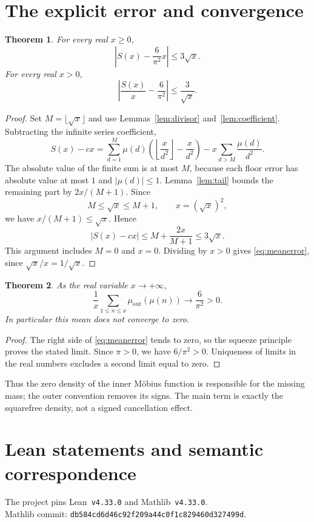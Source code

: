 \documentclass[11pt]{article}
\newtheorem{theorem}{Theorem}
\newcommand{\sfcount}{S}
\begin{document}
\section{The explicit error and convergence}
\begin{theorem}\label{thm:error}
For every real $x\geq0$,
\begin{equation}\label{eq:error}
\left|\sfcount(x)-\frac6{\pi^2}x\right|\leq3\sqrt{x}.
\end{equation}
For every real $x>0$,
\begin{equation}\label{eq:meanerror}
\left|\frac{\sfcount(x)}x-\frac6{\pi^2}\right|
\leq\frac3{\sqrt{x}}.
\end{equation}
\end{theorem}
\begin{proof}
Set $M=\lfloor\sqrt{x}\rfloor$ and use Lemmas~\ref{lem:divisor}
and~\ref{lem:coefficient}. Subtracting the infinite series coefficient,
\[
\sfcount(x)-cx
=\sum_{d=1}^{M}\mu(d)
  \left(\left\lfloor\frac{x}{d^2}\right\rfloor-\frac{x}{d^2}\right)
 -x\sum_{d>M}\frac{\mu(d)}{d^2}.
\]
The absolute value of the finite sum is at most $M$, because each
floor error has absolute value at most $1$ and $|\mu(d)|\leq1$.
Lemma~\ref{lem:tail} bounds the remaining part by $2x/(M+1)$.
Since
\[
M\leq\sqrt{x}\leq M+1,\qquad x=(\sqrt{x})^2,
\]
we have $x/(M+1)\leq\sqrt{x}$. Hence
\[
|\sfcount(x)-cx|\leq M+\frac{2x}{M+1}\leq3\sqrt{x}.
\]
This argument includes $M=0$ and $x=0$. Dividing by $x>0$ gives
\eqref{eq:meanerror}, since $\sqrt{x}/x=1/\sqrt{x}$.
\end{proof}

\begin{theorem}\label{thm:limit}
As the real variable $x\to+\infty$,
\[
\frac1x\sum_{1\leq n\leq x}\mu_{\mathrm{out}}(\mu(n))
\longrightarrow\frac6{\pi^2}>0.
\]
In particular this mean does not converge to zero.
\end{theorem}
\begin{proof}
The right side of \eqref{eq:meanerror} tends to zero, so the squeeze
principle proves the stated limit. Since $\pi>0$, we have
$6/\pi^2>0$. Uniqueness of limits in the real numbers excludes a second
limit equal to zero.
\end{proof}
Thus the zero density of the inner M\"obius function is responsible for
the missing mass; the outer convention removes its signs. The main term
is exactly the squarefree density, not a signed cancellation effect.

\section{Lean statements and semantic correspondence}
The project pins Lean~\texttt{v4.33.0} and Mathlib~\texttt{v4.33.0}.\\
Mathlib commit: \texttt{db584cd6d46c92f209a44c0f1c829460d327499d}.
\end{document}
